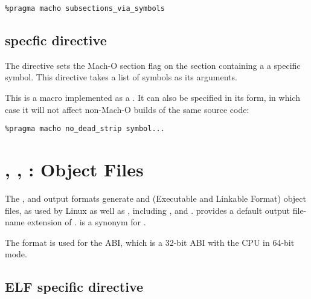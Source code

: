 \begin{lstlisting}
%pragma macho subsections_via_symbols
\end{lstlisting}

\subsection{ specfic directive }
\label{subsec:macho-ssvs}

The directive  sets the Mach-O 
section flag on the section containing a a specific symbol. This directive takes
a list of symbols as its arguments.

This is a macro implemented as a .  It can also be
specified in its  form, in which case it will not affect
non-Mach-O builds of the same source code:

\begin{lstlisting}
%pragma macho no_dead_strip symbol...
\end{lstlisting}

\section{, , :
 Object Files}
\label{sec:elffmt}

The ,  and  output formats generate
 and  (Executable and Linkable Format) object files,
as used by Linux as well as , including
,  and .
 provides a default output file-name extension of .
 is a synonym for .

The  format is used for the  ABI, which is
a 32-bit ABI with the CPU in 64-bit mode.

\subsection{ELF specific directive }
\label{subsec:abisect}

